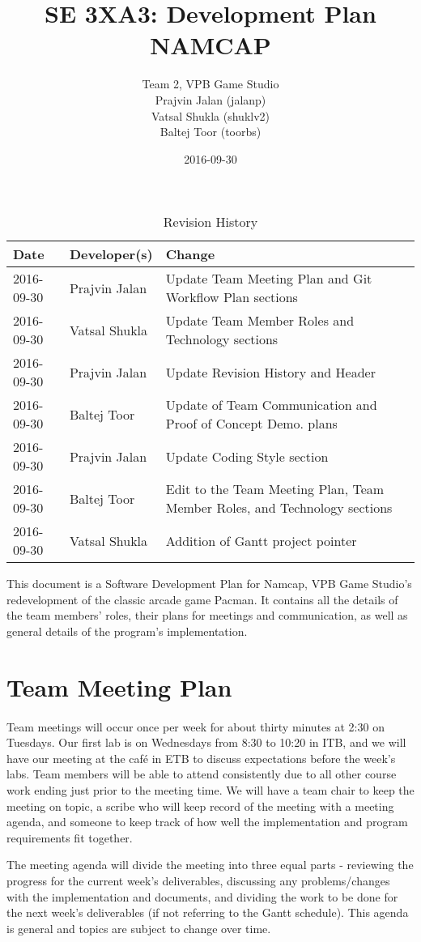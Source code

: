 \documentclass{article}
\title{SE 3XA3: Development Plan\\NAMCAP}
\author{Team 2, VPB Game Studio
		\\ Prajvin Jalan (jalanp)
		\\ Vatsal Shukla (shuklv2)
		\\ Baltej Toor (toorbs)
}
\date{2016-09-30}
\begin{document}
\begin{table}[hp]
\caption{Revision History} \label{TblRevisionHistory}
\begin{tabularx}{\textwidth}{llX}
\toprule
\textbf{Date} & \textbf{Developer(s)} & \textbf{Change}\\
\midrule
2016-09-30 & Prajvin Jalan & Update Team Meeting Plan and Git Workflow Plan sections\\
2016-09-30 & Vatsal Shukla & Update Team Member Roles and Technology sections \\
2016-09-30 & Prajvin Jalan & Update Revision History and Header\\
2016-09-30 & Baltej Toor & Update of Team Communication and Proof of Concept Demo. plans\\
2016-09-30 & Prajvin Jalan & Update Coding Style section\\
2016-09-30 & Baltej Toor & Edit to the Team Meeting Plan, Team Member Roles, and Technology sections\\ 
2016-09-30 & Vatsal Shukla & Addition of Gantt project pointer\\
\bottomrule
\end{tabularx}
\end{table}

\newpage

\maketitle

This document is a Software Development Plan for Namcap, VPB Game Studio's redevelopment of the classic arcade game Pacman. It contains all the details of the team members' roles, their plans for meetings and communication, as well as general details of the program's implementation.

\section{Team Meeting Plan}

\paragraph{}
Team meetings will occur once per week for about thirty minutes at 2:30 on Tuesdays. Our first lab is on Wednesdays from 8:30 to 10:20 in ITB, and we will have our meeting at the café in ETB to discuss expectations before the week's labs. Team members will be able to attend consistently due to all other course work ending just prior to the meeting time. We will have a team chair to keep the meeting on topic, a scribe who will keep record of the meeting with a meeting agenda, and someone to keep track of how well the implementation and program requirements fit together.\par The meeting agenda will divide the meeting into three equal parts - reviewing the progress for the current week's deliverables, discussing any problems/changes with the implementation and documents, and dividing the work to be done for the next week's deliverables (if not referring to the Gantt schedule). This agenda is general and topics are subject to change over time.
\end{document}
